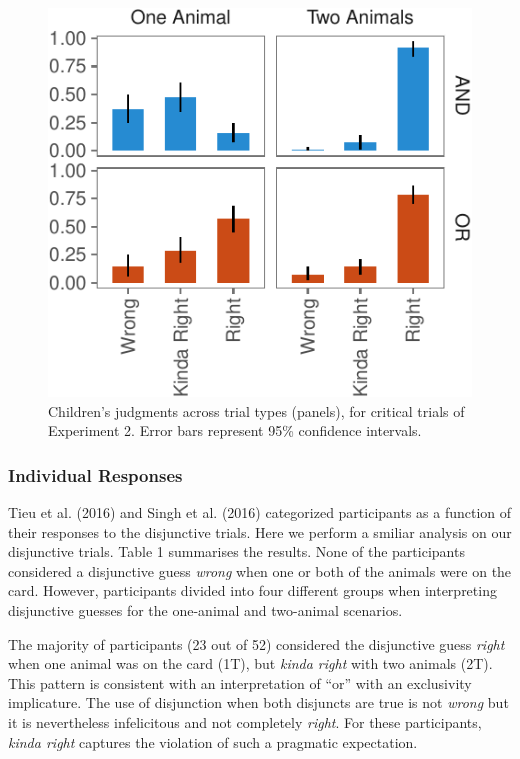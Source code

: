 \documentclass[10pt, letterpaper]{article}
\newenvironment{CodeChunk}{}{}
\begin{document}
\begin{CodeChunk}
\begin{figure}[t]

{\centering \includegraphics{figs/child_data-1} 

}

\caption[Children's judgments across trial types (panels), for critical trials of Experiment 2]{Children's judgments across trial types (panels), for critical trials of Experiment 2. Error bars represent 95\% confidence intervals.}\label{fig:child_data}
\end{figure}
\end{CodeChunk}

\subsubsection{Individual Responses}\label{individual-responses}

Tieu et al. (2016) and Singh et al. (2016) categorized participants as a
function of their responses to the disjunctive trials. Here we perform a
smiliar analysis on our disjunctive trials. Table 1 summarises the
results. None of the participants considered a disjunctive guess
\emph{wrong} when one or both of the animals were on the card. However,
participants divided into four different groups when interpreting
disjunctive guesses for the one-animal and two-animal scenarios.

The majority of participants (23 out of 52) considered the disjunctive
guess \emph{right} when one animal was on the card (1T), but \emph{kinda
right} with two animals (2T). This pattern is consistent with an
interpretation of ``or'' with an exclusivity implicature. The use of
disjunction when both disjuncts are true is not \emph{wrong} but it is
nevertheless infelicitous and not completely \emph{right}. For these
participants, \emph{kinda right} captures the violation of such a
pragmatic expectation.
\end{document}
